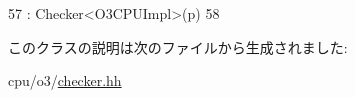 \begin{DoxyCode}
57           : Checker<O3CPUImpl>(p)
58     { }
\end{DoxyCode}


このクラスの説明は次のファイルから生成されました:\begin{DoxyCompactItemize}
\item 
cpu/o3/\hyperlink{checker_8hh}{checker.hh}\end{DoxyCompactItemize}
